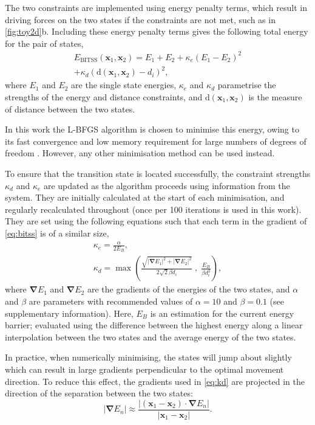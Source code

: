 \documentclass[twocolumn,10pt]{revtex4-2}
\newcommand{\abs}[1]{\left| #1 \right|}
\newcommand{\grad}{\bm{\nabla}}
\begin{document}
The two constraints are implemented using energy penalty terms, which result in driving forces on the two states if the constraints are not met, such as in \cref{fig:toy2d}b.
Including these energy penalty terms gives the following total energy for the pair of states,
\begin{multline}\label{eq:bitss}
  E_\text{BITSS}(\bm{x}_1, \bm{x}_2) = E_1 + E_2
    + \kappa_e \left( E_1 - E_2 \right) ^2 \\
    + \kappa_d \left( \mathrm{d}(\bm{x}_1, \bm{x}_2) - d_i \right) ^2,
\end{multline}
where $E_1$ and $E_2$ are the single state energies, $\kappa_e$ and $\kappa_d$ parametrise the strengths of the energy and distance constraints, and $\mathrm{d}(\bm{x}_1, \bm{x}_2)$ is the measure of distance between the two states.

In this work the L-BFGS algorithm is chosen to minimise this energy, owing to its fast convergence and low memory requirement for large numbers of degrees of freedom \cite{Liu1989}.
However, any other minimisation method can be used instead.

To ensure that the transition state is located successfully, the constraint strengths $\kappa_d$ and $\kappa_e$ are updated as the algorithm proceeds using information from the system.
They are initially calculated at the start of each minimisation, and regularly recalculated throughout (once per 100 iterations is used in this work).
They are set using the following equations such that each term in the gradient of \cref{eq:bitss} is of a similar size,
\begin{gather}
  \kappa_e = \frac {\alpha} {2 E_B},
  \label{eq:ke}
  \\
  \kappa_d = \max \left(
    \frac {\sqrt{\abs{\grad E_1}^2 + \abs{\grad E_2}^2}} {2\sqrt{2} \beta d_i} \; , \;
    \frac{E_B}{\beta d_i^2} \right),
  \label{eq:kd}
\end{gather}
where $\grad E_1$ and $\grad E_2$ are the gradients of the energies of the two states, and $\alpha$ and $\beta$ are parameters with recommended values of $\alpha = 10$ and $\beta = 0.1$ (see supplementary information).
Here, $E_B$ is an estimation for the current energy barrier; evaluated using the difference between the highest energy along a linear interpolation between the two states and the average energy of the two states.

In practice, when numerically minimising, the states will jump about slightly which can result in large gradients perpendicular to the optimal movement direction.
To reduce this effect, the gradients used in \cref{eq:kd} are projected in the direction of the separation between the two states:
\begin{equation}
  \abs{\grad E_n} \approx \frac {\abs{(\bm{x}_1 - \bm{x}_2) \cdot \grad E_n}} {\abs{\bm{x}_1 - \bm{x}_2}}.
\end{equation}
\end{document}
